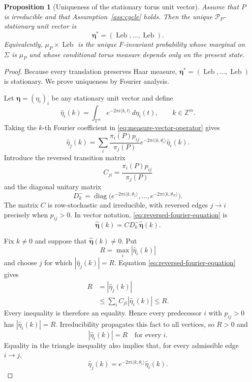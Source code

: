 \documentclass[11pt,a4paper]{amsart}
\newtheorem{proposition}[theorem]{Proposition}
\newcommand{\T}{\mathbb T}
\newcommand{\Z}{\mathbb Z}
\newcommand{\Leb}{\operatorname{Leb}}
\begin{document}
\begin{proposition}[Uniqueness of the stationary torus unit vector]
\label{prop:unique-torus-vector}
Assume that \(P\) is irreducible and that
Assumption~\ref{ass:cycle} holds.  Then the unique
\(\mathcal P_P\)-stationary unit vector is
\[
 \boldsymbol\eta^*
 =(\Leb,\ldots,\Leb).
\]
Equivalently, \(\mu_P\times\Leb\) is the unique \(F\)-invariant
probability whose marginal on \(\Sigma\) is \(\mu_P\) and whose
conditional torus measure depends only on the present state.
\end{proposition}

\begin{proof}
Because every translation preserves Haar measure,
\(\boldsymbol\eta^*=(\Leb,\ldots,\Leb)\) is stationary.
We prove uniqueness by Fourier analysis.

Let \(\boldsymbol\eta=(\eta_i)_i\) be any stationary unit vector and
define
\[
 \widehat\eta_i(k)
 =
 \int_{\T^m}e^{-2\pi i\langle k,t\rangle}\,d\eta_i(t),
 \qquad k\in\Z^m.
\]
Taking the \(k\)-th Fourier coefficient in
\eqref{eq:measure-vector-operator} gives
\begin{equation}\label{eq:reversed-fourier-equation}
 \widehat\eta_j(k)
 =
 \sum_i
 \frac{\pi_i(P)p_{ij}}{\pi_j(P)}
 e^{-2\pi i\langle k,\theta_i\rangle}
 \widehat\eta_i(k).
\end{equation}
Introduce the reversed transition matrix
\[
 C_{ji}
 =
 \frac{\pi_i(P)p_{ij}}{\pi_j(P)}
\]
and the diagonal unitary matrix
\[
 D_k^-=
 \operatorname{diag}\bigl(
 e^{-2\pi i\langle k,\theta_1\rangle},
 \ldots,
 e^{-2\pi i\langle k,\theta_N\rangle}\bigr).
\]
The matrix \(C\) is row-stochastic and irreducible, with reversed
edges \(j\to i\) precisely when \(p_{ij}>0\).  In vector notation,
\eqref{eq:reversed-fourier-equation} is
\[
 \widehat{\boldsymbol\eta}(k)
 =CD_k^-\widehat{\boldsymbol\eta}(k).
\]

Fix \(k\ne0\) and suppose that
\(\widehat{\boldsymbol\eta}(k)\ne0\).  Put
\[
 R=\max_i|\widehat\eta_i(k)|
\]
and choose \(j\) for which
\(|\widehat\eta_j(k)|=R\).  Equation
\eqref{eq:reversed-fourier-equation} gives
\[
\begin{aligned}
 R
 &=|\widehat\eta_j(k)|\\
 &\le
 \sum_iC_{ji}|\widehat\eta_i(k)|
 \le R.
\end{aligned}
\]
Every inequality is therefore an equality.  Hence every predecessor
\(i\) with \(p_{ij}>0\) has
\(|\widehat\eta_i(k)|=R\).  Irreducibility propagates this fact to all
vertices, so \(R>0\) and
\[
 |\widehat\eta_i(k)|=R
 \quad\text{for every }i.
\]
Equality in the triangle inequality also implies that, for every
admissible edge \(i\to j\),
\begin{equation}\label{eq:fourier-edge-phase}
 \widehat\eta_j(k)
 =
 e^{-2\pi i\langle k,\theta_i\rangle}
 \widehat\eta_i(k).
\end{equation}


\end{proof}
\end{document}
